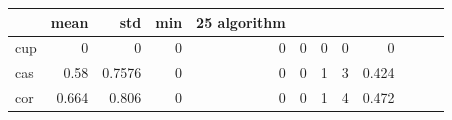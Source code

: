 \begin{tabular}{lrrrrrrrr}
\toprule
 & mean & std & min & 25%
algorithm &  &  &  &  &  &  &  &  \\
\midrule
cup & 0 & 0 & 0 & 0 & 0 & 0 & 0 & 0 \\
cas & 0.58 & 0.7576 & 0 & 0 & 0 & 1 & 3 & 0.424 \\
cor & 0.664 & 0.806 & 0 & 0 & 0 & 1 & 4 & 0.472 \\
\bottomrule
\end{tabular}
